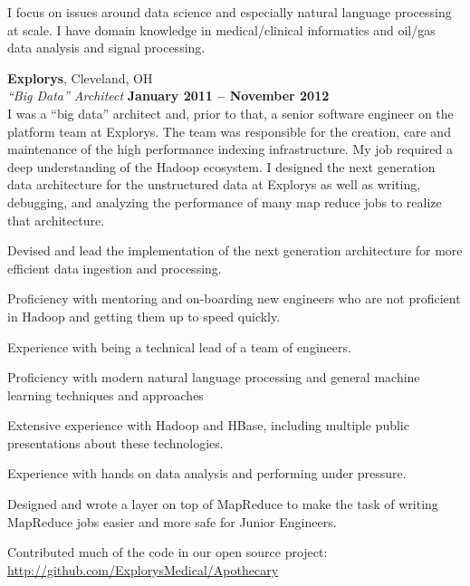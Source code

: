 \documentclass[margin,line,12pt]{resume}
\begin{document}
\begin{resume}
    I focus on issues around data science and especially natural language processing at scale. I have domain knowledge in medical/clinical informatics and oil/gas data analysis and signal processing.

    \textbf{Explorys}, Cleveland, OH \vspace{2mm}\\\vspace{1mm}%
    \textsl{``Big Data'' Architect} \hfill \textbf{January 2011 -- November 2012}\\
    I was a ``big data'' architect and, prior to that, a senior software engineer on the platform team at Explorys. 
    The team was responsible for the creation, care and maintenance of the high performance indexing infrastructure.
    My job required a deep understanding of the Hadoop ecosystem.  I designed the next generation data 
    architecture for the unstructured data at Explorys as well as writing, debugging, and analyzing the 
    performance of many map reduce jobs to realize that architecture.  

    \begin{list2}
    \item  Devised and lead the implementation of the next generation architecture for more efficient data ingestion and processing.
    \item  Proficiency with mentoring and on-boarding new engineers who are not proficient in Hadoop and getting them up to speed quickly.
    \item  Experience with being a technical lead of a team of engineers.
    \item  Proficiency with modern natural language processing and general machine learning techniques and approaches
    \item  Extensive experience with Hadoop and HBase, including multiple public presentations about these technologies.
    \item  Experience with hands on data analysis and performing under pressure.
    \item  Designed and wrote a layer on top of MapReduce to make the task of writing MapReduce jobs easier and more safe for Junior Engineers.
    \item  Contributed much of the code in our open source project: \\\url{http://github.com/ExplorysMedical/Apothecary}
    \end{list2}

    \newpage
    \vspace*{1mm}


\end{resume}
\end{document}
